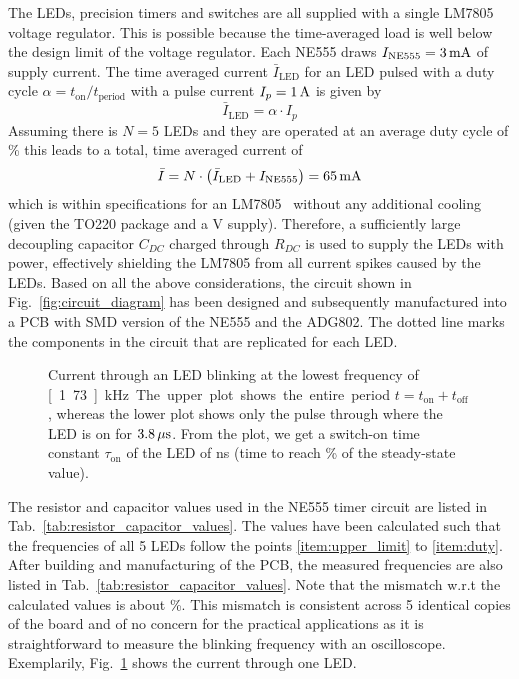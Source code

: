 The LEDs, precision timers and switches are all supplied with a single LM7805 voltage regulator. This is possible because the time-averaged load is well below the design limit of the voltage regulator. Each NE555 draws {$I_\text{NE555} = \unit[3]{mA}$} of supply current. The time averaged current $\bar{I}_\text{LED}$ for an LED pulsed with a duty cycle $\alpha = t_\text{on} / t_\text{period}$ with a pulse current {$I_p = \unit[1]{A}$} is given by
\begin{equation}
    \bar{I}_\text{LED} = \alpha \cdot I_p
\end{equation}
Assuming there is $N=5$ LEDs and they are operated at an average duty cycle of \unit[1]{\%} this leads to a total, time averaged current of 
\begin{equation}
    \bar{I} = N \cdot \left(\bar{I}_\text{LED} + I_\text{NE555} \right) = \unit[65]{mA}
\end{equation}
which is within specifications for an LM7805~\cite{lm7805} without any additional cooling (given the TO220 package and a \unit[12]{V} supply). Therefore, a sufficiently large decoupling capacitor $C_{DC}$ charged through $R_{DC}$ is used to supply the LEDs with power, effectively shielding the LM7805 from all current spikes caused by the LEDs. Based on all the above considerations, the circuit shown in Fig.~\ref{fig:circuit_diagram} has been designed and subsequently manufactured into a PCB with SMD version of the NE555 and the ADG802. The dotted line marks the components in the circuit that are replicated for each LED.

\begin{figure}
    \centering
    
    \vspace*{-6pt}
    \caption{Current through an LED blinking at the lowest frequency of \unit[1.73]{kHz}. The upper plot shows the entire period $t = t_\text{on} + t_\text{off}$, whereas the lower plot shows only the pulse through where the LED is on for $\unit[3.8]{\mu s}$. From the plot, we get a switch-on time constant $\tau_\text{on}$ of the LED of \unit[84]{ns} (time to reach \unit[63]{\%} of the steady-state value).}
    \label{fig:led_current}
\end{figure}

The resistor and capacitor values used in the NE555 timer circuit are listed in Tab.~\ref{tab:resistor_capacitor_values}. The values have been calculated such that the frequencies of all 5 LEDs follow the points \ref{item:upper_limit} to \ref{item:duty}. After building and manufacturing of the PCB, the measured frequencies are also listed in Tab.~\ref{tab:resistor_capacitor_values}. Note that the mismatch w.r.t the calculated values is about \unit[20]{\%}. This mismatch is consistent across 5 identical copies of the board and of no concern for the practical applications as it is straightforward to measure the blinking frequency with an oscilloscope. Exemplarily, Fig.~\ref{fig:led_current} shows the current through one LED.


